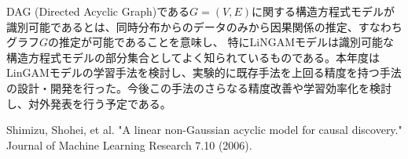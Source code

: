 DAG (Directed Acyclic Graph)である$G=(V,E)$に関する構造方程式モデルが識別可能であるとは、同時分布からのデータのみから因果関係の推定、すなわちグラフ$G$の推定が可能であることを意味し、
特にLiNGAMモデルは識別可能な構造方程式モデルの部分集合としてよく知られているものである\cite{S}。本年度はLinGAMモデルの学習手法を検討し、実験的に既存手法を上回る精度を持つ手法の設計・開発を行った。今後この手法のさらなる精度改善や学習効率化を検討し、対外発表を行う予定である。

\begin{thebibliography}{9}
Shimizu, Shohei, et al. "A linear non-Gaussian acyclic model for causal discovery." Journal of Machine Learning Research 7.10 (2006).
\end{thebibliography}
